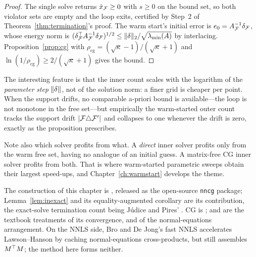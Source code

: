 \begin{proof}
The single solve returns $\hat x_{\mathcal{F}} \ge 0$ with $s \ge 0$ on the bound set, so
both violator sets are empty and the loop exits, certified by Step~2 of
Theorem~\ref{thm:termination}'s proof. The warm start's initial error is
$e_0 = A_{\mathcal{F}}^{-1}\delta_{\mathcal{F}}$, whose energy norm is
$(\delta_{\mathcal{F}}^{\top} A_{\mathcal{F}}^{-1}\delta_{\mathcal{F}})^{1/2} \le \lVert \delta \rVert_2/\sqrt{\lambda_{\min}(A)}$
by interlacing. Proposition~\ref{prop:cg} with
$\rho_{\mathrm{cg}} = (\sqrt\kappa-1)/(\sqrt\kappa+1)$ and
$\ln(1/\rho_{\mathrm{cg}}) \ge 2/(\sqrt\kappa+1)$ gives the bound.
\end{proof}

The interesting feature is that the inner count scales with the logarithm of the
\emph{parameter step} $\lVert \delta \rVert$, not of the solution norm: a finer grid is
cheaper per point. When the support drifts, no comparable a-priori bound is
available---the loop is not monotone in the free set---but empirically the
warm-started outer count tracks the support drift $|\mathcal{F} \triangle \mathcal{F}'|$ and
collapses to one whenever the drift is zero, exactly as the proposition prescribes.

Note also which solver profits from what. A \emph{direct} inner solver profits only
from the warm free set, having no analogue of an initial guess. A matrix-free CG
inner solver profits from both. That is where warm-started parametric sweeps obtain
their largest speed-ups, and Chapter~\ref{ch:warmstart} develops the theme.

\begin{notes}
The construction of this chapter is \cite{schmelzer2026nncg}, released as the
open-source \texttt{nncg} package; Lemma~\ref{lem:inexact} and its
equality-augmented corollary are its contribution, the exact-solve termination count
being Júdice and Pires' \cite{judice1994}. CG is \cite{hestenes1952};
\cite{greenbaum1997} and \cite{trefethenbau1997} are the textbook treatments of its
convergence, and \cite{golub2013} of the normal-equations arrangement. On the NNLS
side, Bro and De Jong's fast NNLS \cite{brodejong1997} accelerates Lawson--Hanson
\cite{lawson1974} by caching normal-equations cross-products, but still assembles
$M^{\top} M$; the method here forms neither.
\end{notes}

